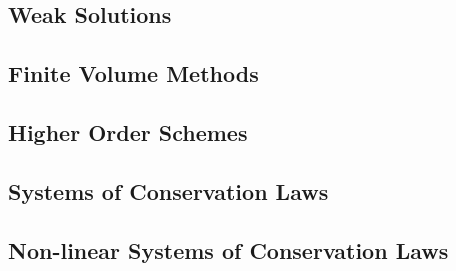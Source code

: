 \documentclass[
  fourColumns,
  landscape
]{formularyETH/formularyETH}
\begin{document}
    \subsection{Weak Solutions}
      
      
      
      
      
      
      
      \newpage
    \subsection{Finite Volume Methods}
      
      
      
      
      
      
      
    \subsection{Higher Order Schemes}
      
      
      
      
      \newpage
    \subsection{Systems of Conservation Laws}
      
      
      
      
      \newpage
    \subsection{Non-linear Systems of Conservation Laws}
      
      
      
      
      
\newpage
\end{document}
